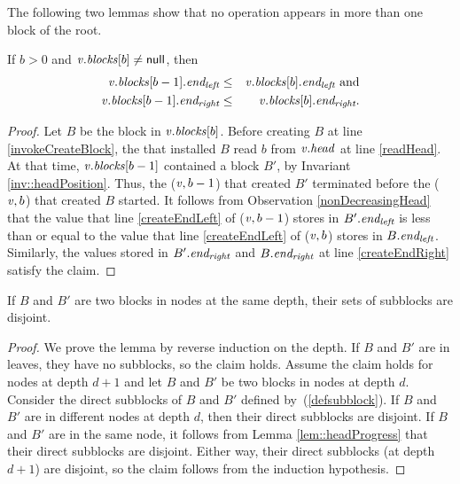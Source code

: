 The following two lemmas show that no operation appears in more than one block of the root.
\begin{lemma} \label{lem::headProgress}
 If $b>0$ and $\mbox{\textnormal{\textit{v}}}.\mbox{\textit{blocks}}[b] \neq \mbox{\sf null}$, then
 \begin{eqnarray*}
 \mbox{\textnormal{\textit{v}}}.\mbox{\textit{blocks}}[b-1].\mbox{\textit{end\textsubscript{left}}} &\leq& \mbox{\textnormal{\textit{v}}}.\mbox{\textit{blocks}}[b].\mbox{\textit{end\textsubscript{left}}} \mbox{ and}\\
 \mbox{\textnormal{\textit{v}}}.\mbox{\textit{blocks}}[b-1].\mbox{\textit{end\textsubscript{right}}} &\leq& \mbox{\textnormal{\textit{v}}}.\mbox{\textit{blocks}}[b].\mbox{\textit{end\textsubscript{right}}}.
 \end{eqnarray*}
\end{lemma}
\begin{proof}
Let $B$ be the block in $\mbox{\textnormal{\textit{v}}}.\mbox{\textit{blocks}}[b]$.
Before creating $B$ at line \ref{invokeCreateBlock}, the  that installed $B$
read $b$ from $\mbox{\textnormal{\textit{v}}}.\mbox{\textit{head}}$ at line \ref{readHead}.
At that time, $\mbox{\textnormal{\textit{v}}}.\mbox{\textit{blocks}}[b-1]$ contained a block $B'$, by Invariant \ref{inv::headPosition}.
Thus, the ($\mbox{\textnormal{\textit{v}}},b-1$) that created $B'$ terminated before the ($\mbox{\textnormal{\textit{v}}},b$) that
created $B$ started.
It follows from Observation \ref{nonDecreasingHead} that the value that 
line \ref{createEndLeft} of ($\mbox{\textnormal{\textit{v}}},b-1$) stores in $B'.\mbox{\textit{end\textsubscript{left}}}$   
is less than or equal to the value that line \ref{createEndLeft} of ($\mbox{\textnormal{\textit{v}}},b$) 
stores in $B.\mbox{\textit{end\textsubscript{left}}}$.
Similarly, the values stored in $B'.\mbox{\textit{end\textsubscript{right}}}$ and $B.\mbox{\textit{end\textsubscript{right}}}$ at line \ref{createEndRight} 
satisfy the claim.
\end{proof}

\begin{lemma} \label{lem::subblocksDistinct}
If $B$ and $B'$ are two blocks in nodes at the same depth, their sets of subblocks are disjoint.
\end{lemma}
\begin{proof}
We prove the lemma by reverse induction on the depth.
If $B$ and $B'$ are in leaves, they have no subblocks, so the claim holds.
Assume the claim holds for nodes at depth $d+1$ and let $B$ and $B'$ be two blocks in nodes at depth $d$.
Consider the direct subblocks of $B$ and $B'$ defined by~(\ref{defsubblock}).
If $B$ and $B'$ are in different nodes at depth $d$, then their direct subblocks are disjoint.
If $B$ and $B'$ are in the same node, it follows from Lemma \ref{lem::headProgress} that their direct subblocks are disjoint.
Either way, their direct subblocks (at depth $d+1$) are disjoint, so the claim follows from the induction hypothesis.
\end{proof}

